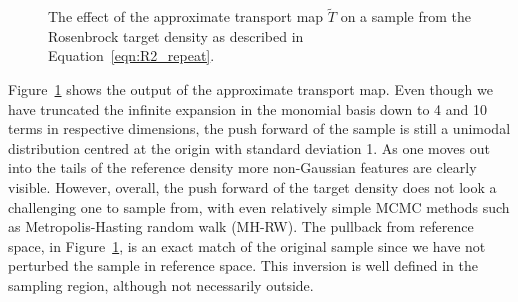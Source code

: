 \documentclass[final]{siamltex}
\begin{document}
\begin{figure}[htpb]
\centering
{}\quad
{}\quad
{}
\caption{The effect of the approximate transport map $\tilde{T}$ on a
  sample from the Rosenbrock target density as described in Equation~\eqref{eqn:R2_repeat}.}
\label{fig:R2_transport}
\end{figure}

Figure~\ref{fig:R2_transport} shows the output of the approximate
transport map. Even though we have truncated the infinite expansion in
the monomial basis down to 4 and 10 terms in respective dimensions,
the push forward of the sample is still a unimodal distribution
centred at the origin with standard deviation 1. As one moves out into
the tails of the reference density more non-Gaussian features are
clearly visible. However, overall, the push forward of the target
density does not look a challenging one to sample from, with even
relatively simple MCMC methods such as Metropolis-Hasting random walk (MH-RW). The pullback from
reference space, in Figure~\ref{fig:R2_transport}, is an exact match
of the original sample since we have not perturbed the sample in
reference space. This inversion is well defined in the sampling
region, although not necessarily outside\cite{parno2014transport}.
\end{document}
